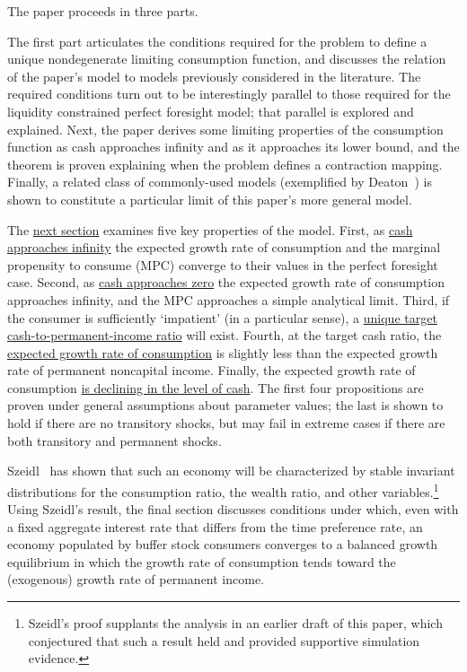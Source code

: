 \documentclass[titlepage]{\econtex}\providecommand{\texname}{BufferStockTheory}
\begin{document}
The paper proceeds in three parts.

The first part articulates the conditions required for the problem to define a unique nondegenerate limiting consumption function, and discusses the relation of the paper's model to models previously considered in the literature.  The required conditions turn out to be interestingly parallel to those required for the liquidity constrained perfect foresight model; that parallel is explored and explained.  Next, the paper derives some limiting properties of the consumption function as cash approaches infinity and as it approaches its lower bound, and the theorem is proven explaining when the problem defines a contraction mapping.  Finally, a related class of commonly-used models (exemplified by Deaton~\citeyearpar{deatonLiqConstr}) is shown to constitute a particular limit of this paper's more general model.

The \hyperlink{AnalysisoftheConvergedConsumptionFunction}{next section} examines five key properties of the model. First, as \hyperlink{LimitsAsmtToInfty}{cash approaches infinity} the expected growth rate of consumption and the marginal propensity to consume (MPC) converge to their values in the perfect foresight case. Second, as \hyperlink{LimitsAsmtToZero}{cash approaches zero} the expected growth rate of consumption approaches infinity, and the MPC approaches a simple analytical limit.  Third, if the consumer is sufficiently `impatient' (in a particular sense), a \hyperlink{onetarget}{unique target cash-to-permanent-income ratio} will exist.  Fourth, at the target cash ratio, the \hyperlink{cGroLTpGro}{expected growth rate of consumption} is slightly less than the expected growth rate of permanent noncapital income.  Finally, the expected growth rate of consumption \hyperlink{dcgdxneg}{is declining in the level of cash}. The first four propositions are proven under general assumptions about parameter values; the last is shown to hold if there are no transitory shocks, but may fail in extreme cases if there are both transitory and permanent shocks.

Szeidl~\citeyearpar{szeidlInvariant} has shown that such an economy will be characterized by stable invariant distributions for the consumption ratio, the wealth ratio, and other variables.\footnote{Szeidl's proof supplants the analysis in an earlier draft of this paper, which conjectured that such a result held and provided supportive simulation evidence.}  Using Szeidl's result, the final section discusses conditions under which, even with a fixed aggregate interest rate that differs from the time preference rate, an economy populated by buffer stock consumers converges to a balanced growth equilibrium in which the growth rate of consumption tends toward the (exogenous) growth rate of permanent income.
\end{document}
